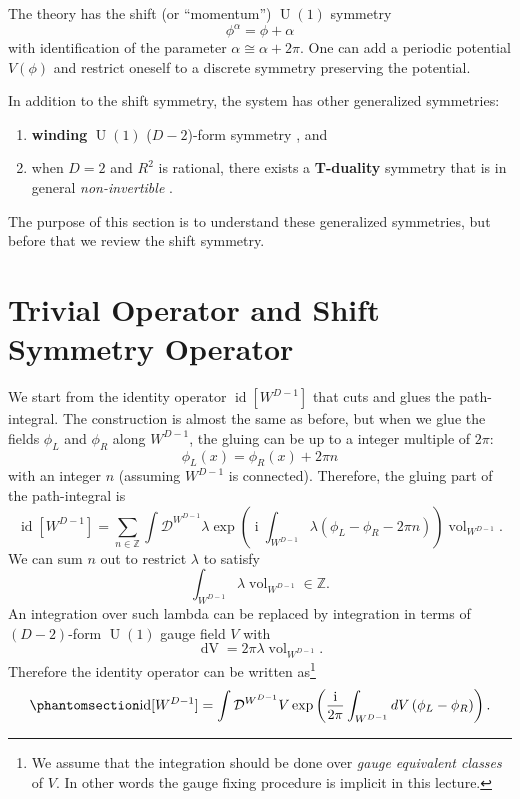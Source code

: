 \documentclass[11pt,toc=bibliography]{scrbook}
\DeclareMathOperator{\vol}{vol}
\DeclareMathOperator{\U}{U}
\DeclareMathOperator{\imunit}{i}
\DeclareMathOperator{\id}{id}
\newcommand{\stdim}{D}
\numberwithin{equation}{section}
\providecommand{\tightlist}{%
  \setlength{\itemsep}{0pt}\setlength{\parskip}{0pt}}
\DeclareMathOperator{\vol}{vol}
\DeclareMathOperator{\U}{U}
\DeclareMathOperator{\imunit}{i}
\DeclareMathOperator{\id}{id}
\newcommand{\stdim}{D}
\begin{document}
The theory has the shift (or ``momentum'') \(\U(1)\) symmetry \[
\phi^\alpha = \phi + \alpha 
\] with identification of the parameter \(\alpha \cong \alpha + 2\pi\).
One can add a periodic potential \(V(\phi)\) and restrict oneself to a
discrete symmetry preserving the potential.

In addition to the shift symmetry, the system has other generalized
symmetries:

\begin{enumerate}
\def\labelenumi{\arabic{enumi}.}
\tightlist
\item
  \textbf{winding} \(\U(1)\) (\(\stdim-2\))-form symmetry
  \autocite{Gaiotto:2014kfa}, and
\item
  when \(\stdim=2\) and \(R^2\) is rational, there exists a
  \textbf{T-duality} symmetry that is in general \emph{non-invertible}
  \autocites{Choi:2021kmx}{Niro:2022ctq}{Cordova:2023ent,Nagoya:2023zky}.
\end{enumerate}

The purpose of this section is to understand these generalized
symmetries, but before that we review the shift symmetry.

\section{Trivial Operator and Shift Symmetry
Operator}\label{trivial-operator-and-shift-symmetry-operator}

We start from the identity operator \(\id[W^{\stdim-1}]\) that cuts and
glues the path-integral. The construction is almost the same as before,
but when we glue the fields \(\phi_L\) and \(\phi_R\) along
\(W^{\stdim-1}\), the gluing can be up to a integer multiple of
\(2\pi\): \[
    \phi_L(x) = \phi_R(x) + 2\pi n 
\] with an integer \(n\) (assuming \(W^{\stdim-1}\) is connected).
Therefore, the gluing part of the path-integral is \[
\id[W^{\stdim-1}] = \sum_{n\in\mathbb{Z}}\int \mathcal{D}^{W^{\stdim-1}}\lambda \exp\left(\imunit\int_{W^{\stdim-1}} \lambda\left(\phi_L-\phi_R - 2\pi n\right)\right)\vol_{W^{\stdim-1}}.
\] We can sum \(n\) out to restrict \(\lambda\) to satisfy \[
    \int_{W^{\stdim-1}}\lambda \vol_{W^{\stdim-1}} \in \mathbb{Z}.
\] An integration over such lambda can be replaced by integration in
terms of \((\stdim-2)\)-form \(\U(1)\) gauge field \(V\) with \[
\mathop{dV} = 2\pi \lambda\vol_{W^{\stdim-1}}.
\] Therefore the identity operator can be written as\footnote{We assume
  that the integration should be done over \emph{gauge equivalent
  classes} of \(V\). In other words the gauge fixing procedure is
  implicit in this lecture.}
\begin{equation}\phantomsection\label{eq-identity-compact-boson}{
    \id[{W^{\stdim-1}}] = \int \mathcal{D}^{W^{\stdim-1}}V \exp\left(\frac{\imunit}{2\pi}\int_{W^{\stdim-1}} \mathop{dV}\left(\phi_L-\phi_R\right)\right).
}\end{equation}
\end{document}
